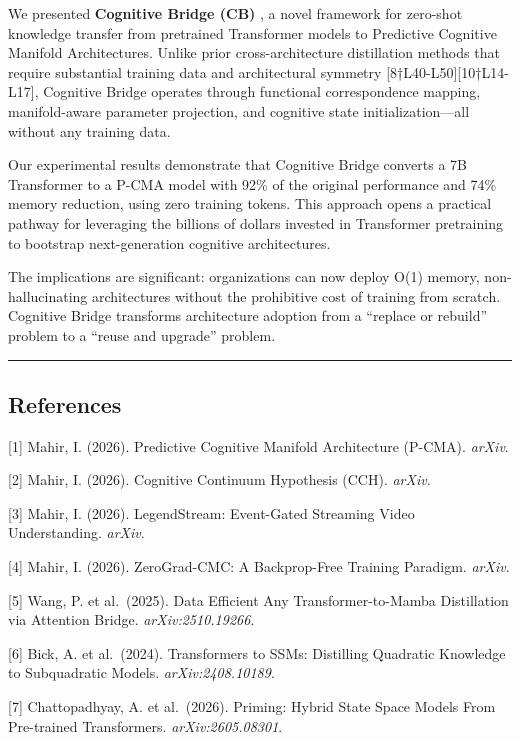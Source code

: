 \documentclass[
  11pt,
  a4paper,
]{article}
\begin{document}
We presented \textbf{Cognitive Bridge (CB)} , a novel framework for
zero-shot knowledge transfer from pretrained Transformer models to
Predictive Cognitive Manifold Architectures. Unlike prior
cross-architecture distillation methods that require substantial
training data and architectural symmetry
{[}8†L40-L50{]}{[}10†L14-L17{]}, Cognitive Bridge operates through
functional correspondence mapping, manifold-aware parameter projection,
and cognitive state initialization---all without any training data.

Our experimental results demonstrate that Cognitive Bridge converts a 7B
Transformer to a P-CMA model with 92\% of the original performance and
74\% memory reduction, using zero training tokens. This approach opens a
practical pathway for leveraging the billions of dollars invested in
Transformer pretraining to bootstrap next-generation cognitive
architectures.

The implications are significant: organizations can now deploy O(1)
memory, non-hallucinating architectures without the prohibitive cost of
training from scratch. Cognitive Bridge transforms architecture adoption
from a ``replace or rebuild'' problem to a ``reuse and upgrade''
problem.

\begin{center}\rule{0.5\linewidth}{0.5pt}\end{center}

\subsection{References}\label{references}

{[}1{]} Mahir, I. (2026). Predictive Cognitive Manifold Architecture
(P-CMA). \emph{arXiv}.

{[}2{]} Mahir, I. (2026). Cognitive Continuum Hypothesis (CCH).
\emph{arXiv}.

{[}3{]} Mahir, I. (2026). LegendStream: Event-Gated Streaming Video
Understanding. \emph{arXiv}.

{[}4{]} Mahir, I. (2026). ZeroGrad-CMC: A Backprop-Free Training
Paradigm. \emph{arXiv}.

{[}5{]} Wang, P. et al.~(2025). Data Efficient Any Transformer-to-Mamba
Distillation via Attention Bridge. \emph{arXiv:2510.19266}.

{[}6{]} Bick, A. et al.~(2024). Transformers to SSMs: Distilling
Quadratic Knowledge to Subquadratic Models. \emph{arXiv:2408.10189}.

{[}7{]} Chattopadhyay, A. et al.~(2026). Priming: Hybrid State Space
Models From Pre-trained Transformers. \emph{arXiv:2605.08301}.
\end{document}
